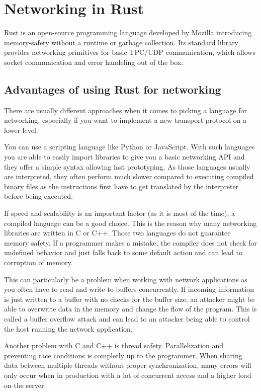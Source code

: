 
\section{Networking in Rust}
Rust is an open-source programming language developed by Mozilla introducing memory-safety without a runtime or garbage
collection. Its standard library provides networking primitives for basic TPC/UDP communication, which allows socket
communication and error handeling out of the box. \cite{rust-language}

\subsection{Advantages of using Rust for networking}
There are usually different approaches when it comes to picking a language for networking, especially if you want to
implement a new transport protocol on a lower level.

You can use a scripting language like Python or JavaScript. With such languages you are able to easily import libraries
to give you a basic networking API and they offer a simple syntax allowing fast prototyping. As those languages usually
are interpreted, they often perform much slower compared to executing compiled binary files as the instructions first
have to get translated by the interpreter before being executed.

If speed and scalability is an important factor (as it is most of the time), a compiled language can be a good choice.
This is the reason why many networking libraries are written in C or C++. Those two languages do not guarantee memory
safety. If a programmer makes a mistake, the compiler does not check for undefined behavior and just falls back to some
default action and can lead to corruption of memory.

This can particularly be a problem when working with network applications as you often have to read and write to
buffers concurrently. If incoming information is just written to a buffer with no checks for the buffer size, an
attacker might be able to overwrite data in the memory and change the flow of the program. This is called a buffer
overflow attack and can lead to an attacker being able to control the host running the network application.
\cite{c00buffer}

Another problem with C and C++ is thread safety. Parallelization and preventing race conditions is completly up to the
programmer. When sharing data between multiple threads without proper synchronization, many errors will only occur when
in production with a lot of concurrent access and a higher load on the server.

